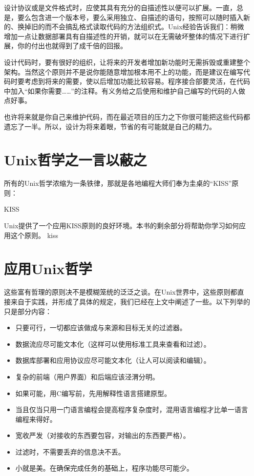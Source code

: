 \documentclass[12pt,oneside]{book}
\begin{document}
\begin{common-format}
设计协议或是文件格式时，应使其具有充分的自描述性以便可以扩展。一直，总是，要么包含进一个版本号，要么采用独立、自描述的语句，按照可以随时插入新的、换掉旧的而不会搞乱格式读取代码的方法组织式。Unix经验告诉我们：稍微增加一点让数据部署具有自描述性的开销，就可以在无需破坏整体的情况下进行扩展，你的付出也就得到了成千倍的回报。

设计代码时，要有很好的组织，让将来的开发者增加新功能时无需拆毁或重建整个架构。当然这个原则并不是说你能随意增加根本用不上的功能，而是建议在编写代码时要考虑到将来的需要，使以后增加功能比较容易。程序接合部要灵活，在代码中加入“如果你需要……”的注释。有义务给之后使用和维护自己编写的代码的人做点好事。

也许将来就是你自己来维护代码，而在最近项目的压力之下你很可能把这些代码都遗忘了一半。所以，设计为将来着眼，节省的有可能就是自己的精力。

\section{Unix哲学之一言以蔽之}
所有的Unix哲学浓缩为一条铁律，那就是各地编程大师们奉为圭桌的“KISS”原则：
\begin{linefig}{KISS}
\label{fig:KISS}
\end{linefig}

Unix提供了一个应用KISS原则的良好环境。本书的剩余部分将帮助你学习如何应用这个原则。
kiss
\section{应用Unix哲学}
这些富有哲理的原则决不是模糊笼统的泛泛之谈。在Unix世界中，这些原则都直接来自于实践，并形成了具体的规定，我们已经在上文中阐述了一些。以下列举的只是部分内容：
\begin{itemize}
\item 只要可行，一切都应该做成与来源和目标无关的过滤器。
\item 数据流应尽可能文本化（这样可以使用标准工具来查看和过滤）。
\item 数据库部署和应用协议应尽可能文本化（让人可以阅读和编辑）。
\item 复杂的前端（用户界面）和后端应该泾渭分明。
\item 如果可能，用C编写前，先用解释性语言搭建原型。
\item 当且仅当只用一门语言编程会提高程序复杂度时，混用语言编程才比单一语言编程来得好。
\item 宽收严发（对接收的东西要包容，对输出的东西要严格）。
\item 过滤时，不需要丢弃的信息决不丢。
\item 小就是美。在确保完成任务的基础上，程序功能尽可能少。
\end{itemize}


\end{common-format}
\end{document}
